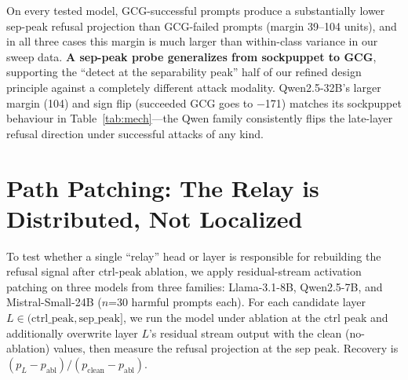 \documentclass{article}
\begin{document}
On every tested model, GCG-successful prompts produce a substantially lower
sep-peak refusal projection than GCG-failed prompts (margin 39–104 units),
and in all three cases this margin is much larger than within-class variance
in our sweep data. \textbf{A sep-peak probe generalizes from sockpuppet to GCG},
supporting the ``detect at the separability peak'' half of our refined
design principle against a completely different attack modality. Qwen2.5-32B's
larger margin (104) and sign flip (succeeded GCG goes to $-$171) matches its
sockpuppet behaviour in Table~\ref{tab:mech}---the Qwen family consistently
flips the late-layer refusal direction under successful attacks of any kind.

\section{Path Patching: The Relay is Distributed, Not Localized}
\label{sec:path_patch}
\label{app:pathpatch}

To test whether a single ``relay'' head or layer is responsible for rebuilding
the refusal signal after ctrl-peak ablation, we apply residual-stream activation
patching on three models from three families: Llama-3.1-8B, Qwen2.5-7B, and
Mistral-Small-24B ($n$=30 harmful prompts each). For each candidate layer
$L \in (\text{ctrl\_peak}, \text{sep\_peak}]$, we run the model under
ablation at the ctrl peak and additionally overwrite layer $L$'s residual
stream output with the clean (no-ablation) values, then measure the refusal
projection at the sep peak. Recovery is
$(p_L - p_\text{abl}) / (p_\text{clean} - p_\text{abl})$.
\end{document}
